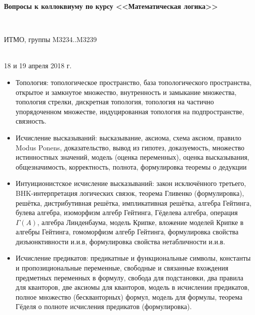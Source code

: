 \documentclass[11pt,a4paper,oneside]{article}
\begin{document}
\begin{center}
\begin{Large}{\bfseries Вопросы к коллоквиуму по курсу <<Математическая логика>>}\end{Large}\\
\vspace{1mm}
\begin{small} ИТМО, группы M3234..M3239\end{small}\\
\small 18 и 19 апреля 2018 г.
\end{center}

\begin{itemize}
\item Топология: топологическое пространство, база топологического пространства, 
открытое и замкнутое множество, внутренность и замыкание множества, топология стрелки,
дискретная топология, топология на частично упорядоченном множестве,
индуцированная топология на подпространстве, связность.
\item Исчисление высказываний: высказывание, аксиома,
схема аксиом, правило Modus Ponens, доказательство,
вывод из гипотез, доказуемость, 
множество истинностных значений, модель (оценка переменных), оценка высказывания, общезначимость, 
корректность, полнота, формулировка теоремы о дедукции
\item Интуиционистское исчисление высказываний: 
закон исключённого третьего, BHK-интерпретация логических связок, теорема Гливенко (формулировка),
решётка, дистрибутивная решётка, импликативная решётка, 
алгебра Гейтинга, булева алгебра, изоморфизм алгебр Гейтинга,
Гёделева алгебра, операция $\Gamma(A)$, алгебра Линденбаума,
модель Крипке, вложение моделей Крипке в алгебры Гейтинга, гомоморфизм алгебр Гейтинга,
формулировка свойства дизъюнктивности и.и.в, формулировка свойства нетабличности и.и.в.
\item Исчисление предикатов:
предикатные и функциональные символы, константы и пропозициональные переменные,
свободные и связанные вхождения предметных переменных в формулу, 
свобода для подстановки, два правила для кванторов, две аксиомы для кванторов,
модель в исчислении предикатов, полное множество (бескванторных) формул, 
модель для формулы, теорема Гёделя о полноте исчисления предикатов (формулировка).
\end{itemize}
\end{document}
